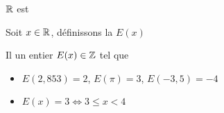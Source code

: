 \begin{frame}
\begin{proposition}
\label{propr:archi}
\quad $\mathbb{R}$ est 
\qquad {}
\end{proposition}

\bigskip
\pause


Soit $x\in \mathbb{R}$, définissons la  $E(x)$
\pause
\begin{proposition}
\label{prop:part_ent}
Il  un  entier $E(x) \in \mathbb{Z}$ tel que 
\end{proposition}

\pause


\begin{exemple} 
\begin{itemize}
\item $E(2,853)=2$, \pause $E(\pi)=3$, \pause $E(-3,5)=-4$
\pause
\item $E(x)=3 \iff 3\leq x <4$
\end{itemize}
\end{exemple}


\end{frame}

\begin{frame}
\end{frame}

